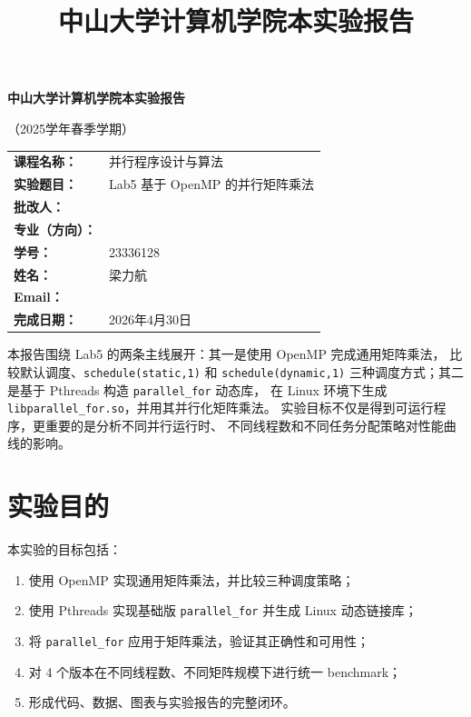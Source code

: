 \documentclass[UTF8,a4paper,12pt,fontset=none]{ctexart}
\title{\bfseries 中山大学计算机学院本实验报告}
\author{}
\date{}
\begin{document}
\begin{titlepage}
  \centering
  {\bfseries 中山大学计算机学院本实验报告\par}
  \vspace{0.5em}
  {（2025学年春季学期）\par}
  \vspace{2em}

  \begin{tabularx}{0.9\textwidth}{>{\bfseries}p{4cm}X}
    课程名称： & 并行程序设计与算法 \\
    实验题目： & Lab5 基于 OpenMP 的并行矩阵乘法 \\
    批改人： & \\
    专业（方向）： & \\
    学号： & 23336128 \\
    姓名： & 梁力航 \\
    Email： & \\
    完成日期： & 2026年4月30日 \\
  \end{tabularx}

  \vfill
  \begin{minipage}{0.88\textwidth}
    \small
    本报告围绕 Lab5 的两条主线展开：其一是使用 OpenMP 完成通用矩阵乘法，
    比较默认调度、\texttt{schedule(static,1)} 和 \texttt{schedule(dynamic,1)}
    三种调度方式；其二是基于 Pthreads 构造 \texttt{parallel\_for} 动态库，
    在 Linux 环境下生成 \texttt{libparallel\_for.so}，并用其并行化矩阵乘法。
    实验目标不仅是得到可运行程序，更重要的是分析不同并行运行时、
    不同线程数和不同任务分配策略对性能曲线的影响。
  \end{minipage}
\end{titlepage}

\section{实验目的}

本实验的目标包括：
\begin{enumerate}[leftmargin=2.2em]
  \item 使用 OpenMP 实现通用矩阵乘法，并比较三种调度策略；
  \item 使用 Pthreads 实现基础版 \texttt{parallel\_for} 并生成 Linux 动态链接库；
  \item 将 \texttt{parallel\_for} 应用于矩阵乘法，验证其正确性和可用性；
  \item 对 4 个版本在不同线程数、不同矩阵规模下进行统一 benchmark；
  \item 形成代码、数据、图表与实验报告的完整闭环。
\end{enumerate}
\end{document}
